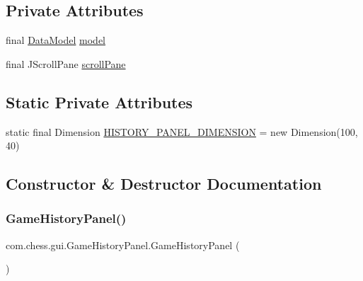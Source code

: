 \subsection*{Private Attributes}
\begin{DoxyCompactItemize}
\item 
final \mbox{\hyperlink{classcom_1_1chess_1_1gui_1_1_game_history_panel_1_1_data_model}{Data\+Model}} \mbox{\hyperlink{classcom_1_1chess_1_1gui_1_1_game_history_panel_ae8fc1e2f5b87693c96d307f984350b6e}{model}}
\item 
final J\+Scroll\+Pane \mbox{\hyperlink{classcom_1_1chess_1_1gui_1_1_game_history_panel_ab853be933add14218f2f8fee47275e20}{scroll\+Pane}}
\end{DoxyCompactItemize}
\subsection*{Static Private Attributes}
\begin{DoxyCompactItemize}
\item 
static final Dimension \mbox{\hyperlink{classcom_1_1chess_1_1gui_1_1_game_history_panel_a63244481b104a771037aca0487abccd9}{H\+I\+S\+T\+O\+R\+Y\+\_\+\+P\+A\+N\+E\+L\+\_\+\+D\+I\+M\+E\+N\+S\+I\+ON}} = new Dimension(100, 40)
\end{DoxyCompactItemize}


\subsection{Constructor \& Destructor Documentation}
\mbox{\label{classcom_1_1chess_1_1gui_1_1_game_history_panel_a8baa19efea3a60e128a429380d73f852}} 
\subsubsection{\texorpdfstring{GameHistoryPanel()}{GameHistoryPanel()}}
{\footnotesize\ttfamily com.\+chess.\+gui.\+Game\+History\+Panel.\+Game\+History\+Panel (\begin{DoxyParamCaption}{ }\end{DoxyParamCaption})\hspace{0.3cm}{\ttfamily [package]}}



